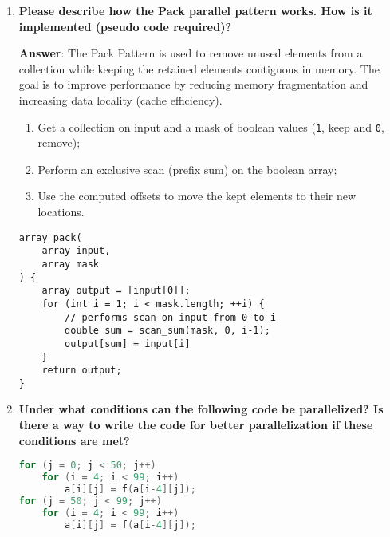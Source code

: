 \begin{enumerate}[label=\Alph*.]
    \item \textcolor{Green3}{\textbf{%
        Please describe how the Pack parallel pattern works. How is it implemented (pseudo code required)?
    }}

    \textbf{Answer}: The Pack Pattern is used to remove unused elements from a collection while keeping the retained elements contiguous in memory. The goal is to improve performance by reducing memory fragmentation and increasing data locality (cache efficiency).

    \begin{enumerate}
        \item Get a collection on input and a mask of boolean values (\texttt{1}, keep and \texttt{0}, remove);
        \item Perform an exclusive scan (prefix sum) on the boolean array;
        \item Use the computed offsets to move the kept elements to their new locations.
    \end{enumerate}
    
    \begin{lstlisting}
array pack(
    array input,
    array mask
) {
    array output = [input[0]];
    for (int i = 1; i < mask.length; ++i) {
        // performs scan on input from 0 to i
        double sum = scan_sum(mask, 0, i-1);
        output[sum] = input[i] 
    }
    return output;
}\end{lstlisting}

    \item \textcolor{Green3}{\textbf{%
        Under what conditions can the following code be parallelized? Is there a way to write the code for better parallelization if these conditions are met?
    }}
    \begin{lstlisting}[language=c++]
for (j = 0; j < 50; j++)
    for (i = 4; i < 99; i++)
        a[i][j] = f(a[i-4][j]);
for (j = 50; j < 99; j++)
    for (i = 4; i < 99; i++)
        a[i][j] = f(a[i-4][j]);\end{lstlisting}


\end{enumerate}
